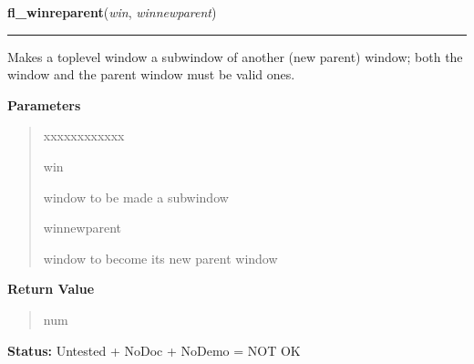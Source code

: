 \hspace{.8\funcindent}\begin{boxedminipage}{\funcwidth}

    \raggedright \textbf{fl\_winreparent}(\textit{win}, \textit{winnewparent})

    \vspace{-1.5ex}

    \rule{\textwidth}{0.5\fboxrule}
\setlength{\parskip}{2ex}
    Makes a toplevel window a subwindow of another (new parent) window; 
    both the window and the parent window must be valid ones.

\setlength{\parskip}{1ex}
      \textbf{Parameters}
      \vspace{-1ex}

      \begin{quote}
        \begin{Ventry}{xxxxxxxxxxxx}

          \item[win]

          window to be made a subwindow

          \item[winnewparent]

          window to become its new parent window

        \end{Ventry}

      \end{quote}

      \textbf{Return Value}
    \vspace{-1ex}

      \begin{quote}
      num

      \end{quote}

\textbf{Status:} Untested + NoDoc + NoDemo = NOT OK



    \end{boxedminipage}

    \label{xformslib:library:fl_winfocus}

    \vspace{0.5ex}

